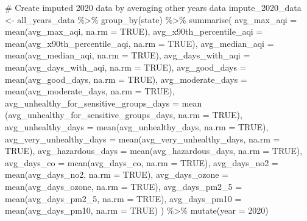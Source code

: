 \documentclass[
  12pt,
]{article}
\newenvironment{Shaded}{\begin{snugshade}}{\end{snugshade}}
\newcommand{\AttributeTok}[1]{\textcolor[rgb]{0.40,0.45,0.13}{#1}}
\newcommand{\CommentTok}[1]{\textcolor[rgb]{0.37,0.37,0.37}{#1}}
\newcommand{\ConstantTok}[1]{\textcolor[rgb]{0.56,0.35,0.01}{#1}}
\newcommand{\DecValTok}[1]{\textcolor[rgb]{0.68,0.00,0.00}{#1}}
\newcommand{\FunctionTok}[1]{\textcolor[rgb]{0.28,0.35,0.67}{#1}}
\newcommand{\NormalTok}[1]{\textcolor[rgb]{0.00,0.23,0.31}{#1}}
\newcommand{\OtherTok}[1]{\textcolor[rgb]{0.00,0.23,0.31}{#1}}
\newcommand{\SpecialCharTok}[1]{\textcolor[rgb]{0.37,0.37,0.37}{#1}}
\begin{document}
\begin{Shaded}
\begin{Highlighting}[]
\CommentTok{\# Create imputed 2020 data by averaging other years\textquotesingle{} data}
\NormalTok{impute\_2020\_data }\OtherTok{\textless{}{-}}\NormalTok{ all\_years\_data }\SpecialCharTok{\%\textgreater{}\%}
  \FunctionTok{group\_by}\NormalTok{(state) }\SpecialCharTok{\%\textgreater{}\%}
  \FunctionTok{summarise}\NormalTok{(}
    \AttributeTok{avg\_max\_aqi =} \FunctionTok{mean}\NormalTok{(avg\_max\_aqi, }
                       \AttributeTok{na.rm =} \ConstantTok{TRUE}\NormalTok{),}
    \AttributeTok{avg\_x90th\_percentile\_aqi =} \FunctionTok{mean}\NormalTok{(avg\_x90th\_percentile\_aqi, }
                                    \AttributeTok{na.rm =} \ConstantTok{TRUE}\NormalTok{),}
    \AttributeTok{avg\_median\_aqi =} \FunctionTok{mean}\NormalTok{(avg\_median\_aqi, }
                          \AttributeTok{na.rm =} \ConstantTok{TRUE}\NormalTok{),}
    \AttributeTok{avg\_days\_with\_aqi =} \FunctionTok{mean}\NormalTok{(avg\_days\_with\_aqi, }
                             \AttributeTok{na.rm =} \ConstantTok{TRUE}\NormalTok{),}
    \AttributeTok{avg\_good\_days =} \FunctionTok{mean}\NormalTok{(avg\_good\_days, }
                         \AttributeTok{na.rm =} \ConstantTok{TRUE}\NormalTok{),}
    \AttributeTok{avg\_moderate\_days =} \FunctionTok{mean}\NormalTok{(avg\_moderate\_days, }
                             \AttributeTok{na.rm =} \ConstantTok{TRUE}\NormalTok{),}
    \AttributeTok{avg\_unhealthy\_for\_sensitive\_groups\_days =}\NormalTok{ mean}
\NormalTok{    (avg\_unhealthy\_for\_sensitive\_groups\_days, }\AttributeTok{na.rm =} \ConstantTok{TRUE}\NormalTok{),}
    \AttributeTok{avg\_unhealthy\_days =} \FunctionTok{mean}\NormalTok{(avg\_unhealthy\_days, }
                              \AttributeTok{na.rm =} \ConstantTok{TRUE}\NormalTok{),}
    \AttributeTok{avg\_very\_unhealthy\_days =} \FunctionTok{mean}\NormalTok{(avg\_very\_unhealthy\_days, }
                                   \AttributeTok{na.rm =} \ConstantTok{TRUE}\NormalTok{),}
    \AttributeTok{avg\_hazardous\_days =} \FunctionTok{mean}\NormalTok{(avg\_hazardous\_days, }
                              \AttributeTok{na.rm =} \ConstantTok{TRUE}\NormalTok{),}
    \AttributeTok{avg\_days\_co =} \FunctionTok{mean}\NormalTok{(avg\_days\_co, }
                       \AttributeTok{na.rm =} \ConstantTok{TRUE}\NormalTok{),}
    \AttributeTok{avg\_days\_no2 =} \FunctionTok{mean}\NormalTok{(avg\_days\_no2, }
                        \AttributeTok{na.rm =} \ConstantTok{TRUE}\NormalTok{),}
    \AttributeTok{avg\_days\_ozone =} \FunctionTok{mean}\NormalTok{(avg\_days\_ozone, }
                          \AttributeTok{na.rm =} \ConstantTok{TRUE}\NormalTok{),}
    \AttributeTok{avg\_days\_pm2\_5 =} \FunctionTok{mean}\NormalTok{(avg\_days\_pm2\_5, }
                          \AttributeTok{na.rm =} \ConstantTok{TRUE}\NormalTok{),}
    \AttributeTok{avg\_days\_pm10 =} \FunctionTok{mean}\NormalTok{(avg\_days\_pm10, }
                         \AttributeTok{na.rm =} \ConstantTok{TRUE}\NormalTok{)}
\NormalTok{  ) }\SpecialCharTok{\%\textgreater{}\%}
  \FunctionTok{mutate}\NormalTok{(}\AttributeTok{year =} \DecValTok{2020}\NormalTok{)  }


\end{Highlighting}
\end{Shaded}
\end{document}
